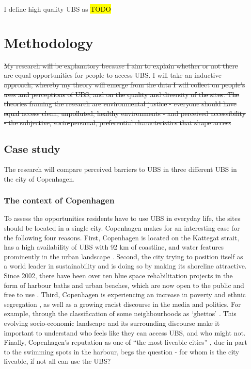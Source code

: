 \documentclass{article}
\begin{document}
I define high quality UBS as \hl{TODO}

\section{Methodology}

\sout{My research will be explanatory because I aim to explain whether or not there are equal opportunities for people to access UBS. I will take an inductive approach, whereby my theory will emerge from the data I will collect on people’s uses and perceptions of UBS, and on the quality and diversity of the sites. The theories framing the research are environmental justice - everyone should have equal access clean, unpolluted, healthy environments - and perceived accessibility - the subjective, socio-personal, preferential characteristics that shape access}

\subsection{Case study}

The research will compare perceived barriers to UBS in three different UBS in the city of Copenhagen.

\subsubsection{The context of Copenhagen}

To assess the opportunities residents have to use UBS in everyday life, the sites should be located in a single city. Copenhagen makes for an interesting case for the following four reasons. First, Copenhagen is located on the Kattegat strait, has a high availability of UBS with 92 km of coastline, and water features prominently in the urban landscape \parencite{comertler2017greens}. Second, the city trying to position itself as a world leader in sustainability and is doing so by making its shoreline attractive. Since 2002, there have been over ten blue space rehabilitation projects in the form of harbour baths and urban beaches, which are now open to the public and free to use \parencite{visitcopenhagen_baths}. Third, Copenhagen is experiencing an increase in poverty and ethnic segregation \parencite{moller2015socioeconomic}, as well as a growing racist discourse in the media and politics. For example, through the classification of some neighbourhoods as ‘ghettos’ \parencite{simonsen2008practice}. This evolving socio-economic landscape and its surrounding discourse make it important to understand who feels like they can access UBS, and who might not. Finally, Copenhagen’s reputation as one of ``the most liveable cities'' \parencite{visitdenmark_2021}, due in part to the swimming spots in the harbour, begs the question - for whom is the city liveable, if not all can use the UBS?
\end{document}
